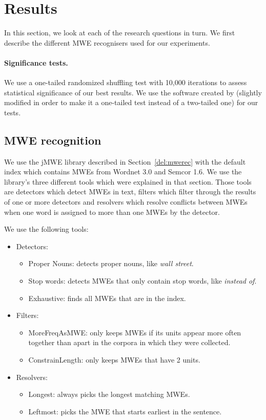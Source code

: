 \documentclass[output=paper]{langsci/langscibook}
\begin{document}
\section{Results}\label{del:exp}
In this section, we look at each of the research questions in turn. We first describe the different MWE recognisers used for our experiments.
\paragraph*{Significance tests.}
We use a one-tailed randomized shuffling test with 10,000 iterations to assess statistical significance of our best results. We use the software created by \citet{sigf06} (slightly modified in order to make it a one-tailed test instead of a two-tailed one) for our tests.

\subsection{MWE recognition}
\label{del:expmwerec}
\indent We use the jMWE library described in Section~\ref{del:mwerec} with the default index which contains MWEs from Wordnet 3.0 and Semcor 1.6. We use the library's three different tools which were explained in that section. Those tools are detectors which detect MWEs in text, filters which filter through the results of one or more detectors and resolvers which resolve conflicts between MWEs when one word is assigned to more than one MWEs by the detector.

We use the following tools:
\begin{itemize}
    \item Detectors:
        \begin{itemize}
            \item Proper Nouns: detects proper nouns, like \textit{wall street}.
            \item Stop words: detects MWEs that only contain stop words, like \textit{instead of}.
            \item Exhaustive: finds all MWEs that are in the index.
        \end{itemize}
    \item Filters:
        \begin{itemize}
            \item MoreFreqAsMWE: only keeps MWEs if its units appear more often together than apart in the corpora in which they were collected.
            \item ConstrainLength: only keeps MWEs that have 2 units.
        \end{itemize}
    \item Resolvers:
        \begin{itemize}
            \item Longest: always picks the longest matching MWEs.
            \item Leftmost: picks the MWE that starts earliest in the sentence.
        \end{itemize}
\end{itemize}
\end{document}
